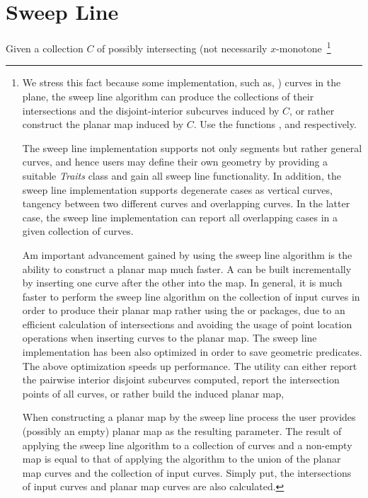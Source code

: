 \section{Sweep Line}


Given a collection $C$ of possibly intersecting 
(not necessarily $x$-monotone~\footnote{
We stress this fact because some implementation, such as, 
) 
curves in the plane, the sweep line algorithm can produce the collections of their 
intersections and the disjoint-interior subcurves induced by $C$, or rather 
construct the planar map induced by $C$. Use the functions ,
 and  respectively.

The sweep line implementation supports not only segments but rather 
general curves, and hence users may define their own geometry by providing a 
suitable {\em Traits} class and gain all sweep line functionality. 
In addition, the sweep line implementation supports degenerate cases as  
vertical curves, tangency between two different curves and overlapping curves. 
In the latter case, the sweep line implementation can report all overlapping cases 
in a given collection of curves. 
 
Am important advancement gained by using the sweep line algorithm 
is the ability to construct a planar map much faster.
A  can be built incrementally by
inserting one curve after the other into the map. 
In general, it is much faster to perform the sweep line algorithm on
the collection of input curves in order to produce their planar map 
rather using the  
or  packages, due to an 
efficient calculation of intersections and avoiding the usage of 
point location operations when inserting curves to the planar map. 
The sweep line implementation has been also optimized in order to 
save geometric predicates. The above optimization speeds up performance. 
The utility can either report the pairwise interior disjoint subcurves
computed, report the intersection points of all curves, 
or rather build the induced planar map, 

When constructing a planar map by the sweep line process the user 
provides (possibly an empty) planar map as the resulting parameter. 
The result of applying the sweep line algorithm to a 
collection of curves and a non-empty map is equal to that 
of applying the algorithm to the union of the
planar map curves and the collection of input curves. Simply put,
the intersections of input curves and planar map curves are also
calculated.

}
